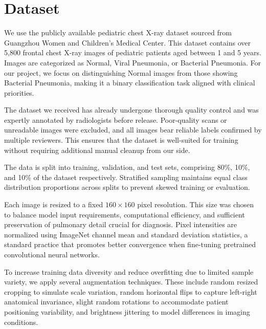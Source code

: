 \documentclass[11pt]{article}
\begin{document}
\section{Dataset}


We use the publicly available pediatric chest X-ray dataset sourced from Guangzhou Women and Children’s Medical Center. This dataset contains over 5,800 frontal chest X-ray images of pediatric patients aged between 1 and 5 years. Images are categorized as Normal, Viral Pneumonia, or Bacterial Pneumonia. For our project, we focus on distinguishing Normal images from those showing Bacterial Pneumonia, making it a binary classification task aligned with clinical priorities.

The dataset we received has already undergone thorough quality control and was expertly annotated by radiologists before release. Poor-quality scans or unreadable images were excluded, and all images bear reliable labels confirmed by multiple reviewers. This ensures that the dataset is well-suited for training without requiring additional manual cleanup from our side.

The data is split into training, validation, and test sets, comprising 80\%, 10\%, and 10\% of the dataset respectively. Stratified sampling maintains equal class distribution proportions across splits to prevent skewed training or evaluation.

Each image is resized to a fixed \(160 \times 160\) pixel resolution. This size was chosen to balance model input requirements, computational efficiency, and sufficient preservation of pulmonary detail crucial for diagnosis. Pixel intensities are normalized using ImageNet channel mean and standard deviation statistics, a standard practice that promotes better convergence when fine-tuning pretrained convolutional neural networks.

To increase training data diversity and reduce overfitting due to limited sample variety, we apply several augmentation techniques. These include random resized cropping to simulate scale variation, random horizontal flips to capture left-right anatomical invariance, slight random rotations to accommodate patient positioning variability, and brightness jittering to model differences in imaging conditions.
\end{document}
